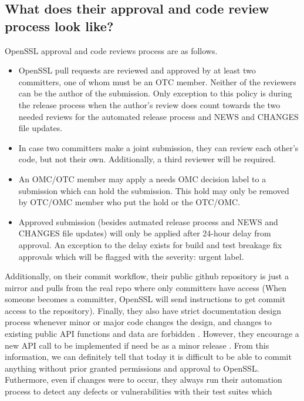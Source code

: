 \documentclass[conference]{IEEEtran}
\begin{document}
\subsection{What does their approval and code review process look like?}
    OpenSSL approval and code reviews process are as follows.
    \begin{itemize}
        \item OpenSSL pull requests are reviewed and approved by at least two committers, one of
        whom must be an OTC member. Neither of the reviewers can be the author of the submission\cite{7}.
        Only exception to this policy is during the release process when the author's review does
        count towards the two needed reviews for the automated release process and NEWS and CHANGES
        file updates\cite{7}.
        \item In case two committers make a joint submission, they can review each other's
        code, but not their own. Additionally, a third reviewer will be required\cite{7}.
        \item An OMC/OTC member may apply a needs OMC decision label to a submission which
        can hold the submission. This hold may only be removed by OTC/OMC member who
        put the hold or the OTC/OMC\cite{7}.
        \item Approved submission (besides autmated release process and NEWS and CHANGES
        file updates) will only be applied
        after 24-hour delay from approval. An exception to the delay exists
        for build and test breakage fix approvals which will be flagged with the
        severity: urgent label\cite{7}.
    \end{itemize}
    Additionally, on their commit workflow, their public github repository is just a mirror
    and pulls from the real repo where only committers have
    access\cite{7} (When someone becomes a committer, OpenSSL will
    send instructions to get commit access to the repository\cite{7}). 
    Finally, they also have strict documentation design process whenever 
    minor or major code changes the design, and
    changes to existing public API functions and data are forbidden
    \cite{9}. However, they encourage a new API call to be implemented
    if need be as a minor release \cite{9}. From this information, we
    can definitely tell that today it is difficult to be able to commit
    anything without prior granted permissions and approval to OpenSSL. Futhermore,
    even if changes were to occur, they always run their automation
    process to detect any defects or vulnerabilities with their test suites which
\end{document}
